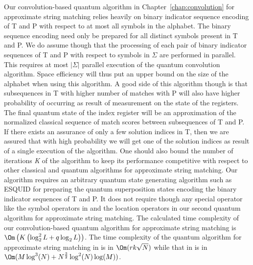 Our convolution-based quantum algorithm in Chapter~\ref{chap:convolution} for approximate string matching relies heavily on binary indicator sequence encoding of T and P with respect to at most all symbols in the alphabet. The binary sequence encoding need only be prepared for all distinct symbols present in T and P. We do assume though that the processing of each pair of binary indicator sequences of T and P with respect to symbols in $\Sigma$ are performed in parallel. This requires at most $\vert \Sigma \vert$ parallel execution of the quantum convolution algorithm. Space efficiency will thus put an upper bound on the size of the alphabet when using this algorithm. A good side of this algorithm though is that subsequences in T with higher number of matches with P will also have higher probability of occurring as result of measurement on the state of the registers. The final quantum state of the index register will be an approximation of the normalized classical sequence of match scores between subsequences of T and P.  If there exists an assurance of only a few solution indices in T, then we are assured that with high probability we will get one of the solution indices as result of a single execution of the algorithm. One should also bound the number of iterations \textit{K} of the algorithm to keep its performance competitive with respect to other classical and quantum algorithms for approximate string matching. Our algorithm requires an arbitrary quantum state generating algorithm such as ESQUID \cite{Rosenbaum2009} for preparing the quantum superposition states encoding the binary indicator sequences of T and P. It does not require though any special operator like the symbol operators in \cite{Mateus2006} and the location operators in our second quantum algorithm for approximate string matching. The calculated time complexity of our convolution-based quantum algorithm for approximate string matching is $\Om\left( K\left(\log_2^2 L + q\log_2 L \right) \right)$. The time complexity of the quantum algorithm for approximate string matching in \cite{Hollenberg2000} is in $\Om(rk\sqrt{N})$ while that in \cite{Mateus2006} is in $\Om(M\log^3(N) + N^{\frac{3}{2}}\log^2(N)\log(M))$.

